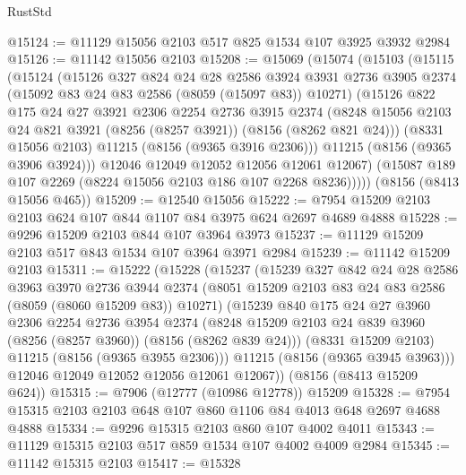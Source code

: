 \begin{lexlean}{RustStd}
\begin{coremodule}
{\begin{coremodule}
{{{{{{{{{{{{{{{{{{{{{{{{{{{{{{{{{{@15124 := @11129 @15056 @2103 @517 @825 @1534 @107 @3925 @3932 @2984
@15126 := @11142 @15056 @2103
@15208 := @15069
    (@15074
      (@15103
        (@15115
          (@15124
            (@15126
              @327
              @824
              @24
              @28
              @2586
              @3924
              @3931
              @2736
              @3905
              @2374
              (@15092 @83 @24 @83 @2586 (@8059 (@15097 @83)) @10271)
              (@15126
                @822
                @175
                @24
                @27
                @3921
                @2306
                @2254
                @2736
                @3915
                @2374
                (@8248 @15056 @2103 @24 @821 @3921 (@8256 (@8257 @3921)) (@8156 (@8262 @821 @24)))
                (@8331 @15056 @2103)
                @11215
                (@8156 (@9365 @3916 @2306)))
              @11215
              (@8156 (@9365 @3906 @3924)))
            @12046
            @12049
            @12052
            @12056
            @12061
            @12067)
          (@15087 @189 @107 @2269 (@8224 @15056 @2103 @186 @107 @2268 @8236)))))
    (@8156 (@8413 @15056 @465))
@15209 := @12540 @15056
@15222 := @7954 @15209 @2103 @2103 @624 @107 @844 @1107 @84 @3975 @624 @2697 @4689 @4888
@15228 := @9296 @15209 @2103 @844 @107 @3964 @3973
@15237 := @11129 @15209 @2103 @517 @843 @1534 @107 @3964 @3971 @2984
@15239 := @11142 @15209 @2103
@15311 := @15222
    (@15228
      (@15237
        (@15239
          @327
          @842
          @24
          @28
          @2586
          @3963
          @3970
          @2736
          @3944
          @2374
          (@8051 @15209 @2103 @83 @24 @83 @2586 (@8059 (@8060 @15209 @83)) @10271)
          (@15239
            @840
            @175
            @24
            @27
            @3960
            @2306
            @2254
            @2736
            @3954
            @2374
            (@8248 @15209 @2103 @24 @839 @3960 (@8256 (@8257 @3960)) (@8156 (@8262 @839 @24)))
            (@8331 @15209 @2103)
            @11215
            (@8156 (@9365 @3955 @2306)))
          @11215
          (@8156 (@9365 @3945 @3963)))
        @12046
        @12049
        @12052
        @12056
        @12061
        @12067))
    (@8156 (@8413 @15209 @624))
@15315 := @7906 (@12777 (@10986 @12778)) @15209
@15328 := @7954 @15315 @2103 @2103 @648 @107 @860 @1106 @84 @4013 @648 @2697 @4688 @4888
@15334 := @9296 @15315 @2103 @860 @107 @4002 @4011
@15343 := @11129 @15315 @2103 @517 @859 @1534 @107 @4002 @4009 @2984
@15345 := @11142 @15315 @2103
@15417 := @15328
}}}}}}}}}}}}}}}}}}}}}}}}}}}}}}}}}}
\end{coremodule}}
\end{coremodule}
\end{lexlean}
